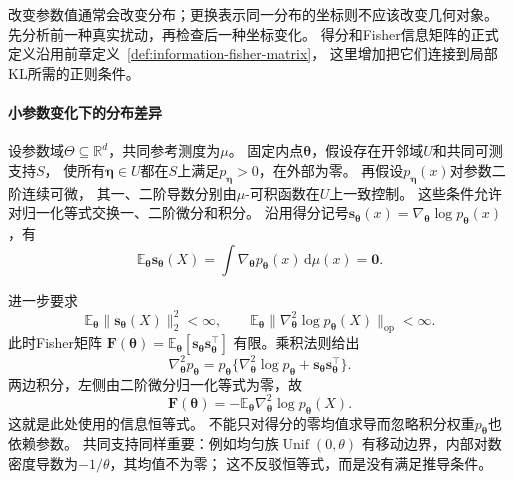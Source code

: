 改变参数值通常会改变分布；更换表示同一分布的坐标则不应该改变几何对象。
先分析前一种真实扰动，再检查后一种坐标变化。
得分和Fisher信息矩阵的正式定义沿用前章定义~\ref{def:information-fisher-matrix}，
这里增加把它们连接到局部KL所需的正则条件。

\paragraph{小参数变化下的分布差异}
\label{sec:information-local-kl}

设参数域\(\Theta\subseteq\mathbb R^d\)，共同参考测度为\(\mu\)。
固定内点\(\bm\theta\)，假设存在开邻域\(U\)和共同可测支持\(S\)，
使所有\(\bm\eta\in U\)都在\(S\)上满足\(p_{\bm\eta}>0\)，在外部为零。
再假设\(p_{\bm\eta}(x)\)对参数二阶连续可微，
其一、二阶导数分别由\(\mu\)-可积函数在\(U\)上一致控制。
这些条件允许对归一化等式交换一、二阶微分和积分。
沿用得分记号\(\bm s_{\bm\theta}(x)=\nabla_{\bm\theta}\log p_{\bm\theta}(x)\)，有
\begin{equation}
  \mathbb E_{\bm\theta}\bm s_{\bm\theta}(X)
  =\int\nabla_{\bm\theta}p_{\bm\theta}(x)\,\mathrm d\mu(x)=\bm0.
  \label{eq:information-score-zero}
\end{equation}

进一步要求
\[
  \mathbb E_{\bm\theta}\|\bm s_{\bm\theta}(X)\|_2^2<\infty,\qquad
  \mathbb E_{\bm\theta}
  \|\nabla^2_{\bm\theta}\log p_{\bm\theta}(X)\|_{\mathrm{op}}<\infty.
\]
此时Fisher矩阵
\(\bm F(\bm\theta)=\mathbb E_{\bm\theta}[\bm s_{\bm\theta}\bm s_{\bm\theta}^\top]\)
有限。乘积法则给出
\[
  \nabla^2_{\bm\theta}p_{\bm\theta}
  =p_{\bm\theta}
   \{\nabla^2_{\bm\theta}\log p_{\bm\theta}
      +\bm s_{\bm\theta}\bm s_{\bm\theta}^\top\}.
\]
两边积分，左侧由二阶微分归一化等式为零，故
\begin{equation}
  \bm F(\bm\theta)
  =-\mathbb E_{\bm\theta}\nabla^2_{\bm\theta}\log p_{\bm\theta}(X).
  \label{eq:information-fisher-hessian-identity}
\end{equation}
这就是此处使用的信息恒等式。
不能只对得分的零均值求导而忽略积分权重\(p_{\bm\theta}\)也依赖参数。
共同支持同样重要：例如均匀族\(\operatorname{Unif}(0,\theta)\)
有移动边界，内部对数密度导数为\(-1/\theta\)，其均值不为零；
这不反驳恒等式，而是没有满足推导条件。

